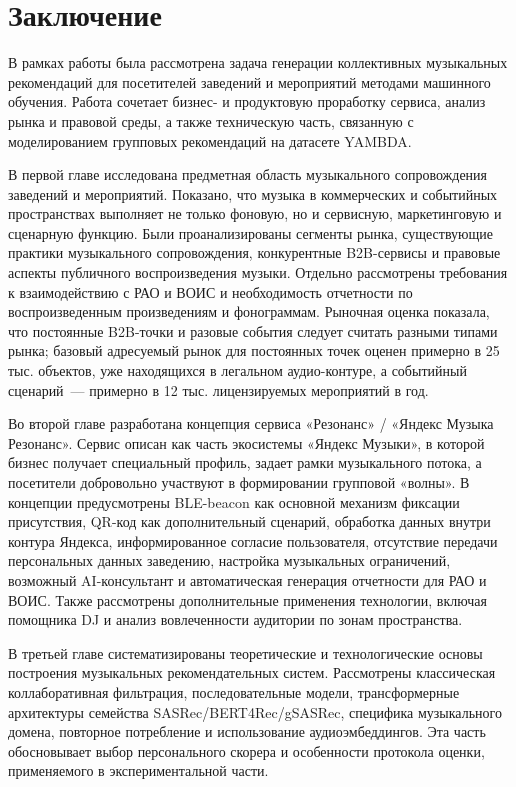 \chapter*{Заключение}

В рамках работы была рассмотрена задача генерации коллективных музыкальных рекомендаций для посетителей заведений и мероприятий методами машинного обучения. Работа сочетает бизнес- и продуктовую проработку сервиса, анализ рынка и правовой среды, а также техническую часть, связанную с моделированием групповых рекомендаций на датасете YAMBDA.

В первой главе исследована предметная область музыкального сопровождения заведений и мероприятий. Показано, что музыка в коммерческих и событийных пространствах выполняет не только фоновую, но и сервисную, маркетинговую и сценарную функцию. Были проанализированы сегменты рынка, существующие практики музыкального сопровождения, конкурентные B2B-сервисы и правовые аспекты публичного воспроизведения музыки. Отдельно рассмотрены требования к взаимодействию с РАО и ВОИС и необходимость отчетности по воспроизведенным произведениям и фонограммам. Рыночная оценка показала, что постоянные B2B-точки и разовые события следует считать разными типами рынка; базовый адресуемый рынок для постоянных точек оценен примерно в 25 тыс. объектов, уже находящихся в легальном аудио-контуре, а событийный сценарий~--- примерно в 12 тыс. лицензируемых мероприятий в год.

Во второй главе разработана концепция сервиса «Резонанс» / «Яндекс Музыка Резонанс». Сервис описан как часть экосистемы «Яндекс Музыки», в которой бизнес получает специальный профиль, задает рамки музыкального потока, а посетители добровольно участвуют в формировании групповой «волны». В концепции предусмотрены BLE-beacon как основной механизм фиксации присутствия, QR-код как дополнительный сценарий, обработка данных внутри контура Яндекса, информированное согласие пользователя, отсутствие передачи персональных данных заведению, настройка музыкальных ограничений, возможный AI-консультант и автоматическая генерация отчетности для РАО и ВОИС. Также рассмотрены дополнительные применения технологии, включая помощника DJ и анализ вовлеченности аудитории по зонам пространства.

В третьей главе систематизированы теоретические и технологические основы построения музыкальных рекомендательных систем. Рассмотрены классическая коллаборативная фильтрация, последовательные модели, трансформерные архитектуры семейства SASRec/BERT4Rec/gSASRec, специфика музыкального домена, повторное потребление и использование аудиоэмбеддингов. Эта часть обосновывает выбор персонального скорера и особенности протокола оценки, применяемого в экспериментальной части.

